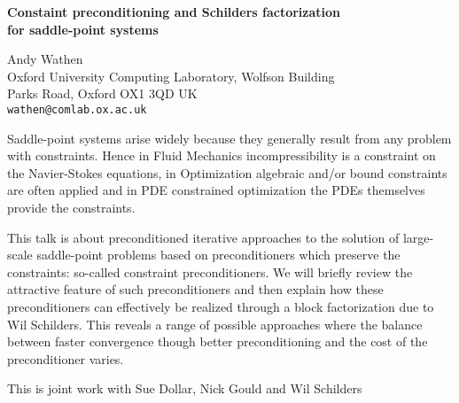 \documentclass{report}
\begin{document}

\begin{center}
{\large
{\bf Constaint preconditioning and Schilders factorization \\
	for saddle-point systems}}

	Andy Wathen \\
	Oxford University Computing Laboratory, Wolfson Building \\
	Parks Road, Oxford OX1 3QD UK \\
	{\tt wathen@comlab.ox.ac.uk}
\end{center}
Saddle-point systems arise widely because they generally
result from any problem with constraints. Hence in Fluid
Mechanics incompressibility is a constraint on the
Navier-Stokes equations, in Optimization algebraic and/or
bound constraints are often applied and in PDE constrained
optimization the PDEs themselves provide the constraints.


This talk is about preconditioned iterative approaches to
the solution of large-scale saddle-point problems based on
preconditioners which preserve the constraints: so-called
constraint preconditioners. We will briefly review the
attractive feature of such preconditioners and then explain
how these preconditioners can effectively be realized
through a block factorization due to Wil Schilders. This
reveals a range of possible approaches where the balance
between faster convergence though better preconditioning and
the cost of the preconditioner varies.

This is joint
work with Sue Dollar, Nick Gould and Wil Schilders


\end{document}
